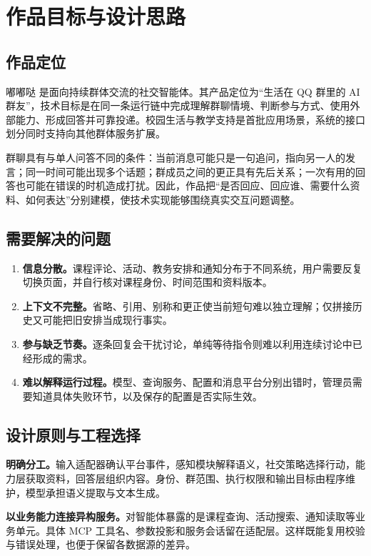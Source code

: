 \section{作品目标与设计思路}
\subsection{作品定位}
嘟嘟哒 是面向持续群体交流的社交智能体。其产品定位为“生活在 QQ 群里的 AI 群友”，技术目标是在同一条运行链中完成理解群聊情境、判断参与方式、使用外部能力、形成回答并可靠投递。校园生活与教学支持是首批应用场景，系统的接口划分同时支持向其他群体服务扩展。

群聊具有与单人问答不同的条件：当前消息可能只是一句追问，指向另一人的发言；同一时间可能出现多个话题；群成员之间的更正具有先后关系；一次有用的回答也可能在错误的时机造成打扰。因此，作品把“是否回应、回应谁、需要什么资料、如何表达”分别建模，使技术实现能够围绕真实交互问题调整。

\subsection{需要解决的问题}
\begin{enumerate}
\item \textbf{信息分散。}课程评论、活动、教务安排和通知分布于不同系统，用户需要反复切换页面，并自行核对课程身份、时间范围和资料版本。
\item \textbf{上下文不完整。}省略、引用、别称和更正使当前短句难以独立理解；仅拼接历史又可能把旧安排当成现行事实。
\item \textbf{参与缺乏节奏。}逐条回复会干扰讨论，单纯等待指令则难以利用连续讨论中已经形成的需求。
\item \textbf{难以解释运行过程。}模型、查询服务、配置和消息平台分别出错时，管理员需要知道具体失败环节，以及保存的配置是否实际生效。
\end{enumerate}

\subsection{设计原则与工程选择}
\textbf{明确分工。}输入适配器确认平台事件，感知模块解释语义，社交策略选择行动，能力层获取资料，回答层组织内容。身份、群范围、执行权限和输出目标由程序维护，模型承担语义提取与文本生成。

\textbf{以业务能力连接异构服务。}对智能体暴露的是课程查询、活动搜索、通知读取等业务单元。具体 MCP 工具名、参数投影和服务会话留在适配层。这样既能复用校验与错误处理，也便于保留各数据源的差异。


